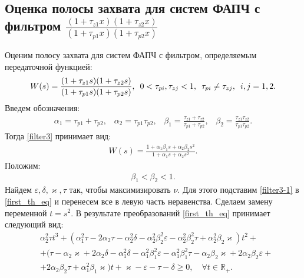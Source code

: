 \documentclass[a4paper,article,14pt]{extarticle}
\begin{document}
\subsection{Оценка полосы захвата для систем ФАПЧ с фильтром $\frac{(1+\tau_{z1}x)(1+\tau_{z2}x)}{(1+\tau_{p1}x)(1+\tau_{p2}x)}$}
Оценим полосу захвата для систем ФАПЧ с фильтром, определяемым передаточной функцией:
 \begin{equation}\label{filter3}
 \begin{aligned}
W(s) = \frac{(1+\tau_{z1}s)(1+\tau_{z2}s)}{(1+\tau_{p1}s)(1+\tau_{p2}s)}, \enskip 0<\tau_{pi},\tau_{zj} < 1, \enskip \tau_{pi} \neq \tau_{zj}, \enskip i,j=1,2.
 \end{aligned}
\end{equation}
Введем обозначения:
 \begin{equation}
 \begin{aligned}
\alpha_1 = \tau_{p1} + \tau_{p2}\text{,}\quad 
\alpha_2 = \tau_{p1}\tau_{p2}\text{,}\quad 
\beta_1 = \frac{\tau_{z1}+\tau_{z2}}{\tau_{p1}+\tau_{p2}}\text{,}\quad 
\beta_2 = \frac{\tau_{z1}\tau_{z2}}{\tau_{p1}\tau_{p2}}.
 \end{aligned}
\end{equation}
Тогда \eqref{filter3} принимает вид:
 \begin{equation}\label{filter3-1}
 \begin{aligned}
W(s) = \frac{1+\alpha_1\beta_1s + \alpha_2\beta_2s^2}{1+\alpha_1s + \alpha_2s^2}.
 \end{aligned}
\end{equation}
Положим:
 \begin{equation}\label{restriction-1}
 \begin{aligned}
\beta_1 < \beta_2 < 1.
 \end{aligned}
\end{equation}
Найдем $\varepsilon, \delta, \varkappa, \tau$ так, чтобы максимизировать $\nu$. Для этого подставим \eqref{filter3-1} в \eqref{first_th_eq} и перенесем все в левую часть неравенства. Сделаем замену переменной $t = s^2$. В результате преобразований \eqref{first_th_eq} принимает следующий вид:
 \begin{equation}\label{filter3-th_first-1}
 \begin{aligned}
&\alpha_2^2\tau t^3 + (\alpha_1^2\tau - 2\alpha_2\tau - \alpha_2^2\delta - \alpha_2^2\beta_2^2\varepsilon - \alpha_2^2\beta_2^2\tau + \alpha_2^2\beta_2\varkappa)t^2 +\\
&+ (\tau - \alpha_2\varkappa + 2\alpha_2\delta - \alpha_1^2\delta - \alpha_1^2\beta_1^2\varepsilon - \alpha_1^2\beta_1^2\tau - \alpha_2\beta_2\varkappa + 2\alpha_2\beta_2\varepsilon + \\
&+2\alpha_2\beta_2\tau + \alpha_1^2\beta_1\varkappa)t + \varkappa - \varepsilon - \tau - \delta \geqslant 0, \quad \forall t \in \mathbb{R_+}.
 \end{aligned}
\end{equation}
\end{document}
